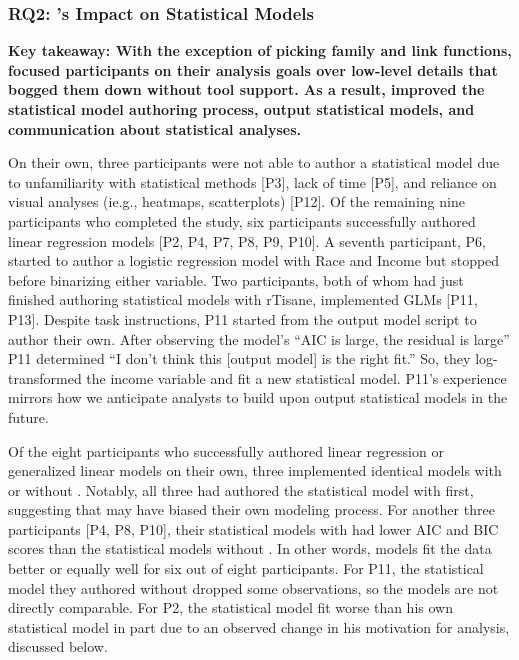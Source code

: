 
\subsubsection{RQ2: \rTisane's Impact on Statistical Models}
\textbf{Key takeaway: With the exception of picking family and link functions,
\rTisane focused participants on their analysis goals over low-level details
that bogged them down without tool support. As a result, \rTisane improved the
statistical model authoring process, output statistical models, and
communication about statistical analyses.
}

On their own, three participants were not able to author a statistical model due
to unfamiliarity with statistical methods [P3], lack of time [P5], and reliance
on visual analyses (ie.g., heatmaps, scatterplots) [P12]. Of the remaining nine
participants who completed the study, six participants successfully authored
linear regression models [P2, P4, P7, P8, P9, P10]. A seventh participant, P6,
started to author a logistic regression model with Race and Income but stopped
before binarizing either variable. Two participants, both of whom had just
finished authoring statistical models with rTisane, implemented GLMs [P11, P13].
Despite task instructions, P11 started from the \rTisane output model script to
author their own. After observing the model's ``AIC is large, the residual is
large'' P11 determined ``I don't think this [\rTisane output model] is the right
fit.'' So, they log-transformed the income variable and fit a new statistical model. P11's experience mirrors how we anticipate analysts to build
upon \rTisane output statistical models in the future. 

Of the eight participants who successfully authored linear regression or
generalized linear models on their own, three implemented identical models with
or without \rTisane [P7, P9, P13]. Notably, all three had authored the
statistical model with \rTisane first, suggesting that \rTisane may have biased
their own modeling process. For another three participants [P4, P8, P10], their
statistical models with \rTisane had lower AIC and BIC scores than the
statistical models without \rTisane. In other words, \rTisane models fit the data
better or equally well for six out of eight participants. For P11, the
statistical model they authored without \rTisane dropped some observations, so
the models are not directly comparable. For P2, the \rTisane statistical model fit
worse than his own statistical model in part due to an observed change in his
motivation for analysis, discussed below. 

